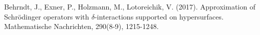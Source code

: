 \begin{thebibliography}{99.}%
 Behrndt, J., Exner, P., Holzmann, M.,  Lotoreichik, V. (2017). Approximation of Schr\"{o}dinger operators with $\delta$-interactions supported on hypersurfaces. Mathematische Nachrichten, 290(8-9), 1215-1248.

\end{thebibliography}

